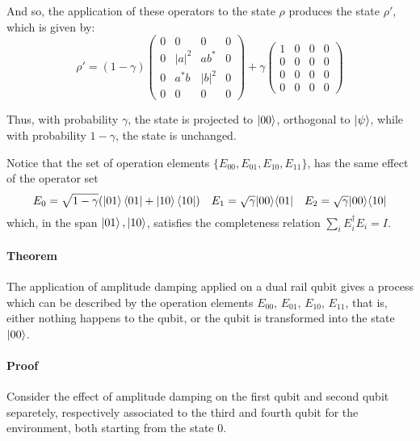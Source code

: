 \documentclass{masterthesis}
\begin{document}
And so, the application of these operators to the state $\rho$ produces the state $\rho'$, which is given by:
\begin{equation}\label{eq:ad-dual-rail}
    \rho' = (1-\gamma)\begin{pmatrix} 0 & 0 & 0 & 0 \\ 0 & |a|^{2} & a b^{*} & 0 \\ 0 & a^{*} b & |b|^{2} & 0 \\ 0 & 0 & 0 & 0 \end{pmatrix} + \gamma\begin{pmatrix} 1 & 0 & 0 & 0 \\ 0 & 0 & 0 & 0 \\ 0 & 0 & 0 & 0 \\ 0 & 0 & 0 & 0 \end{pmatrix}
\end{equation}

Thus, with probability $\gamma$, the state is projected to $\ket{00}$, orthogonal to $\ket{\psi}$, while with probability $1-\gamma$, the state is unchanged. 

Notice that the set of operation elements $\{E_{00}, E_{01}, E_{10}, E_{11}\}$, has the same effect of the operator set
\begin{equation}
    E_{0} = \sqrt{1-\gamma}(\ket{01}\bra{01} + \ket{10}\bra{10}) \quad E_{1} = \sqrt{\gamma}|00\rangle\langle 01| \quad E_{2} = \sqrt{\gamma}|00\rangle\langle 10|
\end{equation}
which, in the span ${\ket{01}, \ket{10}}$, satisfies the completeness relation $\sum_{i} E_{i}^{\dagger} E_{i} = I$.

\paragraph*{Theorem}
The application of amplitude damping applied on a dual rail qubit gives a process which can be described by the operation elements \hyperref[eq:op-el-1]{$E_{00}$}, \hyperref[eq:op-el-2]{$E_{01}$}, \hyperref[eq:op-el-3]{$E_{10}$}, \hyperref[eq:op-el-4]{$E_{11}$}, that is, either nothing happens to the qubit, or the qubit is transformed into the state $\ket{00}$. 

\paragraph*{Proof}
Consider the effect of amplitude damping on the first qubit and second qubit separetely, respectively associated to the third and fourth qubit for the environment, both starting from the state 0.
\end{document}
